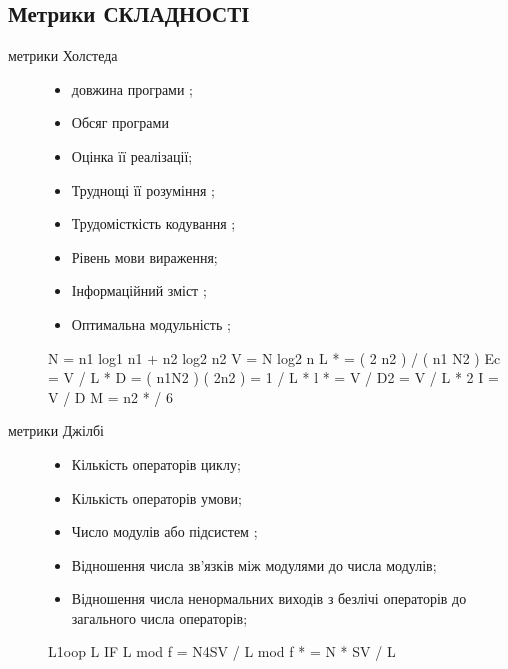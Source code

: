 \subsection{Метрики СКЛАДНОСТІ}
\label{2section:id7}\begin{description}
\item[{метрики Холстеда}] \leavevmode\begin{itemize}
\item {} 
довжина програми ;

\item {} 
Обсяг програми

\item {} 
Оцінка її реалізації;

\item {} 
Труднощі її розуміння ;

\item {} 
Трудомісткість кодування ;

\item {} 
Рівень мови вираження;

\item {} 
Інформаційний зміст ;

\item {} 
Оптимальна модульність ;

\end{itemize}

N = n1 log1 n1 + n2 log2 n2
V = N log2 n
L * = ( 2 n2 ) / ( n1 N2 )
Ec = V / L *
D = ( n1N2 ) ( 2n2 ) = 1 / L *
l * = V / D2 = V / L * 2
I = V / D
M = n2 * / 6

\item[{метрики Джілбі}] \leavevmode\begin{itemize}
\item {} 
Кількість операторів циклу;

\item {} 
Кількість операторів умови;

\item {} 
Число модулів або підсистем ;

\item {} 
Відношення числа зв'язків між модулями до числа модулів;

\item {} 
Відношення числа ненормальних виходів з безлічі операторів до загального числа операторів;

\end{itemize}

L1oop
L IF
L mod
f = N4SV / L mod
f * = N * SV / L


\end{description}
